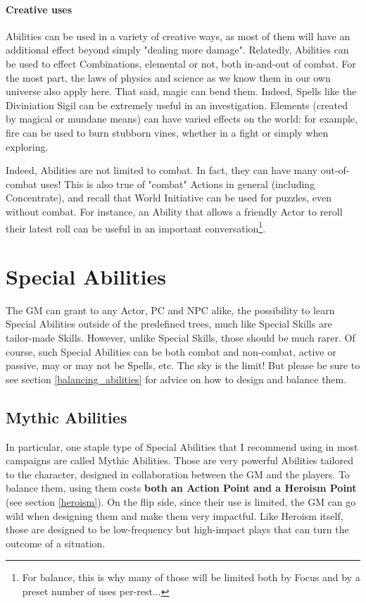 \paragraph{Creative uses} 

\label{creative_use}

Abilities can be used in a variety of creative ways, as most of them will have an additional effect beyond simply "dealing more damage". Relatedly, Abilities can be used to effect Combinations, elemental or not, both in-and-out of combat. For the most part, the laws of physics and science as we know them in our own universe also apply here. That said, magic can bend them. Indeed, Spells like the Diviniation Sigil can be extremely useful in an investigation. Elements (created by magical or mundane means) can have varied effects on the world: for example, fire can be used to burn stubborn vines, whether in a fight or simply when exploring.

Indeed, Abilities are not limited to combat. In fact, they can have many out-of-combat uses! This is also true of "combat" Actions in general (including Concentrate), and recall that World Initiative can be used for puzzles, even without combat. For instance, an Ability that allows a friendly Actor to reroll their latest roll can be useful in an important conversation\footnote{For balance, this is why many of those will be limited both by Focus and by a preset number of uses per-rest...}.


\section{Special Abilities}

The GM can grant to any Actor, PC and NPC alike, the possibility to learn Special Abilities outside of the predefined trees, much like Special Skills are tailor-made Skills. However, unlike Special Skills, those should be much rarer. Of course, such Special Abilities can be both combat and non-combat, active or passive, may or may not be Spells, etc. The sky is the limit! But please be sure to see section \ref{balancing_abilities} for advice on how to design and balance them.


\subsection{Mythic Abilities}

\label{signature}

In particular, one staple type of Special Abilities that I recommend using in most campaigns are called Mythic Abilities. Those are very powerful Abilities tailored to the character, designed in collaboration between the GM and the players. To balance them, using them costs \textbf{both an Action Point and a Heroism Point} (see section \ref{heroism}). On the flip side, since their use is limited, the GM can go wild when designing them and make them very impactful. Like Heroism itself, those are designed to be low-frequency but high-impact plays that can turn the outcome of a situation.

